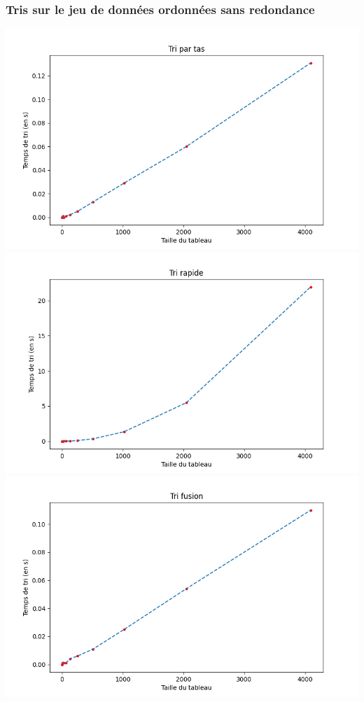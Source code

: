 \documentclass[11pt,a4paper]{article}
\begin{document}
\subsubsection{Tris sur le jeu de données ordonnées sans redondance}
    \includegraphics[scale = 0.7]{../Courbes/Valeurs_triées_sans_répétitions/Tri par tas.png}
    \includegraphics[scale = 0.7]{../Courbes/Valeurs_triées_sans_répétitions/Tri rapide.png}
    \includegraphics[scale = 0.7]{../Courbes/Valeurs_triées_sans_répétitions/Tri fusion.png}
\end{document}
